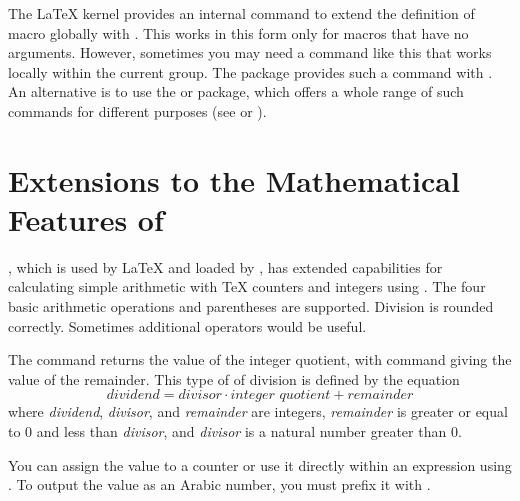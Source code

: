 \begin{Declaration}
\end{Declaration}%
The \LaTeX{} kernel provides an internal command  to
extend the definition of macro  globally with
. This works in this form only for macros that have no
arguments. However, sometimes you may need a command like this that works
locally within the current group. The  package provides such
a command with . An alternative is to use the
 or
 package, which offers a whole range of
such commands for different purposes (see \cite{package:etoolbox} or
\cite{package:xpatch}).%
\EndIndexGroup


\section{Extensions to the Mathematical Features of \eTeX}

\eTeX{}, which is used by \LaTeX{} and loaded by \KOMAScript{}, has extended
capabilities for calculating simple arithmetic with \TeX{} counters and
integers using . The four basic arithmetic
operations and parentheses are supported. Division is rounded
correctly. Sometimes additional operators would be useful.

\begin{Declaration}
\end{Declaration}%
The command
 returns the value of the integer quotient, with command
 giving the value of the remainder. This type of of division is
defined by the equation
\[
\textit{dividend} = \textit{divisor} \cdot
\textit{integer quotient} + \textit{remainder}
\]
where \textit{dividend}, \textit{divisor}, and \textit{remainder} are
integers, \textit{remainder} is greater or equal to 0 and less than
\textit{divisor}, and \textit{divisor} is a natural number greater than 0.

You can assign the value to a counter or use it directly within an expression
using . To output the value as an Arabic number, you must
prefix it with .%
%
\EndIndexGroup
%
\EndIndexGroup

\endinput

